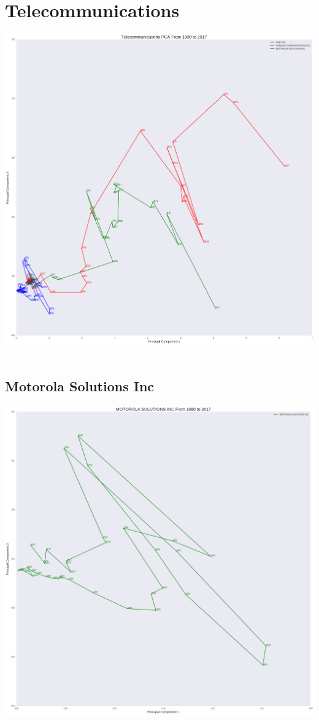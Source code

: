 \section{Telecommunications}
\includegraphics[width=1\textwidth]{./Telecommunications}\\[0.1in] \\
\subsection{Motorola Solutions Inc}
\includegraphics[width=1\textwidth]{./Motorola}\\[0.1in] \\
